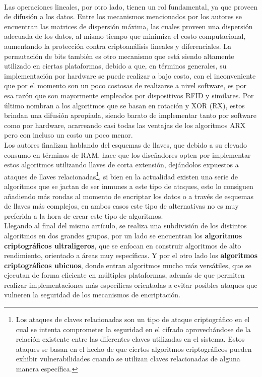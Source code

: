 \documentclass[]{article}
\begin{document}
\\ Las operaciones lineales, por otro lado, tienen un rol fundamental, ya que proveen de difusión a los datos. Entre los mecanismos mencionados por los autores se encuentran las matrices de dispersión máxima, las cuales proveen una dispersión adecuada de los datos, al mismo tiempo que minimiza el costo computacional, aumentando la protección contra criptoanálisis lineales y diferenciales. La permutación de bits también es otro mecanismo que está siendo altamente utilizado en ciertas plataformas, debido a que, en términos generales, su implementación por hardware se puede realizar a bajo costo, con el inconveniente que por el momento son un poco costosas de realizarse a nivel software, es por esa razón que son mayormente empleados por dispositivos RFID y similares. Por último nombran a los algoritmos que se basan en rotación y XOR (RX), estos brindan una difusión apropiada, siendo barato de implementar tanto por software como por hardware, acarreando casi todas las ventajas de los algoritmos ARX pero con incluso un costo un poco menor.
\\ Los autores finalizan hablando del esquemas de llaves, que debido a su elevado consumo en términos de RAM, hace que los diseñadores opten por implementar estos algoritmos utilizando llaves de corta extensión, dejándolos expuestos a ataques de llaves relacionadas\footnote{Los ataques de claves relacionadas son un tipo de ataque criptográfico en el cual se intenta comprometer la seguridad en el cifrado aprovechándose de la relación existente entre las diferentes claves utilizadas en el sistema. Estos ataques se basan en el hecho de que ciertos algoritmos criptográficos pueden exhibir vulnerabilidades cuando se utilizan claves relacionadas de alguna manera específica.}, si bien en la actualidad existen una serie de algoritmos que se jactan de ser inmunes a este tipo de ataques, esto lo consiguen añadiendo más rondas al momento de encriptar los datos o a través de esquemas de llaves más complejos, en ambos casos este tipo de alternativas no es muy preferida a la hora de crear este tipo de algoritmos.
\\Llegando al final del mismo artículo, se realiza una subdivisión de los distintos algoritmos en dos grandes grupos, por un lado se encuentran los \textbf{algoritmos criptográficos ultraligeros}, que se enfocan en construir algoritmos de alto rendimiento, orientado a áreas muy específicas. Y por el otro lado los \textbf{algoritmos criptográficos ubicuos}, donde entran algoritmos mucho más versátiles, que se ejecutan de forma eficiente en múltiples plataformas, además de que permiten realizar implementaciones más específicas orientadas a evitar posibles ataques que vulneren la seguridad de los mecanismos de encriptación.
\nocite{*}
\printbibliography[heading=bibintoc]
\end{document}
